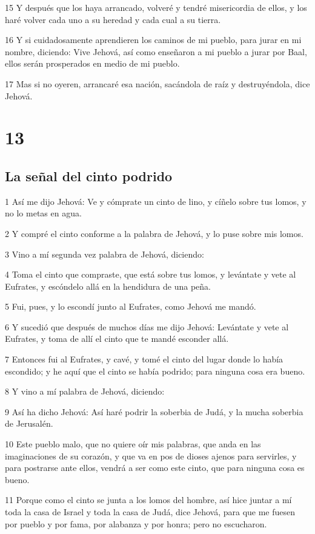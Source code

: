 \par 15 Y después que los haya arrancado, volveré y tendré misericordia de ellos, y los haré volver cada uno a su heredad y cada cual a su tierra.
\par 16 Y si cuidadosamente aprendieren los caminos de mi pueblo, para jurar en mi nombre, diciendo: Vive Jehová, así como enseñaron a mi pueblo a jurar por Baal, ellos serán prosperados en medio de mi pueblo.
\par 17 Mas si no oyeren, arrancaré esa nación, sacándola de raíz y destruyéndola, dice Jehová.

\chapter{13}

\section*{La señal del cinto podrido}

\par 1 Así me dijo Jehová: Ve y cómprate un cinto de lino, y cíñelo sobre tus lomos, y no lo metas en agua.
\par 2 Y compré el cinto conforme a la palabra de Jehová, y lo puse sobre mis lomos.
\par 3 Vino a mí segunda vez palabra de Jehová, diciendo:
\par 4 Toma el cinto que compraste, que está sobre tus lomos, y levántate y vete al Eufrates, y escóndelo allá en la hendidura de una peña.
\par 5 Fui, pues, y lo escondí junto al Eufrates, como Jehová me mandó.
\par 6 Y sucedió que después de muchos días me dijo Jehová: Levántate y vete al Eufrates, y toma de allí el cinto que te mandé esconder allá.
\par 7 Entonces fui al Eufrates, y cavé, y tomé el cinto del lugar donde lo había escondido; y he aquí que el cinto se había podrido; para ninguna cosa era bueno.
\par 8 Y vino a mí palabra de Jehová, diciendo:
\par 9 Así ha dicho Jehová: Así haré podrir la soberbia de Judá, y la mucha soberbia de Jerusalén. 
\par 10 Este pueblo malo, que no quiere oír mis palabras, que anda en las imaginaciones de su corazón, y que va en pos de dioses ajenos para servirles, y para postrarse ante ellos, vendrá a ser como este cinto, que para ninguna cosa es bueno.
\par 11 Porque como el cinto se junta a los lomos del hombre, así hice juntar a mí toda la casa de Israel y toda la casa de Judá, dice Jehová, para que me fuesen por pueblo y por fama, por alabanza y por honra; pero no escucharon.

